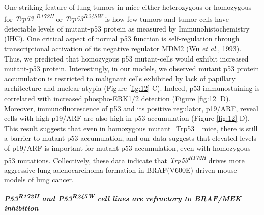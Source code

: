One striking feature of lung tumors in mice either heterozygous or homozygous for \emph{Trp53 \textsuperscript{R172H}} or \emph{Trp53\textsuperscript{R245W}} is how few tumors and tumor cells have detectable levels of mutant-p53 protein as measured by Immunohistochemistry (IHC). One critical aspect of normal p53 function is self-regulation through transcriptional activation of its negative regulator MDM2 (Wu \emph{et al.}, 1993). Thus, we predicted that homozygous p53 mutant-cells would exhibit increased mutant-p53 protein. Interestingly, in our models, we observed mutant p53 protein accumulation is restricted to malignant cells exhibited by lack of papillary architecture and nuclear atypia (Figure \ref{fig:12} C). Indeed, p53 immunostaining is correlated with increased phospho-ERK1/2 detection (Figure \ref{fig:12} D). Moreover, immunofluorescence of p53 and its positive regulator, p19/ARF, reveal cells with high p19/ARF are also high in p53 accumulation (Figure \ref{fig:12} D). This result suggests that even in homozygous mutant\_Trp53\_ mice, there is still a barrier to mutant-p53 accumulation, and our data suggests that elevated levels of p19/ARF is important for mutant-p53 accumulation, even with homozygous p53 mutations. Collectively, these data indicate that \emph{Trp53\textsuperscript{R172H}} drives more aggressive lung adenocarcinoma formation in BRAF(V600E) driven mouse models of lung cancer.

\emph{\textbf{P53\textsuperscript{R172H} and P53\textsuperscript{R245W} cell lines are refractory to BRAF/MEK inhibition}}


